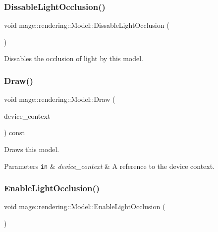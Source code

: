 \subsubsection{\texorpdfstring{Dissable\+Light\+Occlusion()}{DissableLightOcclusion()}}
{\footnotesize\ttfamily void mage\+::rendering\+::\+Model\+::\+Dissable\+Light\+Occlusion (\begin{DoxyParamCaption}{ }\end{DoxyParamCaption})\hspace{0.3cm}{\ttfamily [noexcept]}}

Dissables the occlusion of light by this model. \hypertarget{classmage_1_1rendering_1_1_model_aaa10d71022d4f6ac8e51ec95861f3317}{}\label{classmage_1_1rendering_1_1_model_aaa10d71022d4f6ac8e51ec95861f3317} 
\subsubsection{\texorpdfstring{Draw()}{Draw()}}
{\footnotesize\ttfamily void mage\+::rendering\+::\+Model\+::\+Draw (\begin{DoxyParamCaption}\item[{I\+D3\+D11\+Device\+Context \&}]{device\+\_\+context }\end{DoxyParamCaption}) const\hspace{0.3cm}{\ttfamily [noexcept]}}

Draws this model.


\begin{DoxyParams}[1]{Parameters}
\mbox{\tt in}  & {\em device\+\_\+context} & A reference to the device context. \\
\hline
\end{DoxyParams}
\hypertarget{classmage_1_1rendering_1_1_model_a6fc53c4d0d5983ecd2f1910002b4dcfc}{}\label{classmage_1_1rendering_1_1_model_a6fc53c4d0d5983ecd2f1910002b4dcfc} 
\subsubsection{\texorpdfstring{Enable\+Light\+Occlusion()}{EnableLightOcclusion()}}
{\footnotesize\ttfamily void mage\+::rendering\+::\+Model\+::\+Enable\+Light\+Occlusion (\begin{DoxyParamCaption}{ }\end{DoxyParamCaption})\hspace{0.3cm}{\ttfamily [noexcept]}}

